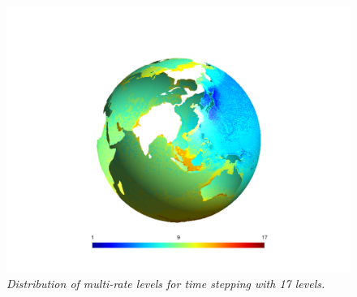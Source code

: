 \begin{figure}[h!]
\begin{center}
\includegraphics[trim=6cm 2cm 6cm 4cm,clip=true,width=0.5\linewidth]{./figures/GlobalOceanLevels.pdf}
\caption{\emph{Distribution of  multi-rate levels for time stepping with 17 levels.}}
\label{fig:world_ocean_levels}
\end{center}
\end{figure}



